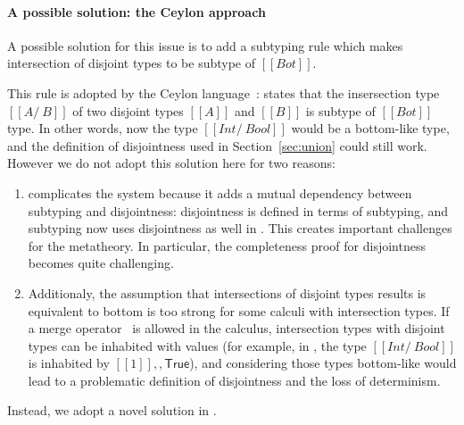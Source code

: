 \paragraph{A possible solution: the Ceylon approach}
A possible solution for this issue is to add a subtyping rule which makes intersection of
disjoint types to be subtype of $[[Bot]]$.

\begin{center}
\end{center}

\noindent This rule is adopted by the Ceylon language~\cite{muehlboeck2018empowering}:
 states that the insersection type $[[A /\ B]]$
of two disjoint types $[[A]]$ and $[[B]]$ is subtype of $[[Bot]]$ type.
In other words, now the type $[[Int /\ Bool]]$ would be a bottom-like type, and the
definition of disjointness used in Section~\ref{sec:union} could still work.
However we do not adopt this solution here for two reasons:

\begin{enumerate}

\item {} complicates the system because
  it adds a mutual dependency between subtyping and disjointness:
  disjointness is defined in terms of subtyping, and subtyping now
  uses disjointness as well in . This creates important
  challenges for the metatheory. In particular, the completeness proof
  for disjointness becomes quite challenging.

\item Additionaly, the assumption that intersections of disjoint types
  results is equivalent to bottom is too strong for some calculi with intersection
  types. If a merge operator~\cite{} is allowed in the calculus, intersection types
  with disjoint types can be inhabited with values (for example, in \cite{},
  the type $[[Int /\ Bool]]$ is inhabited by $[[1]] ,, \mathsf{True}$), and considering those
  types bottom-like would lead to a problematic definition of disjointness and the loss
  of determinism.


\end{enumerate}

Instead, we adopt a novel solution in \name.

